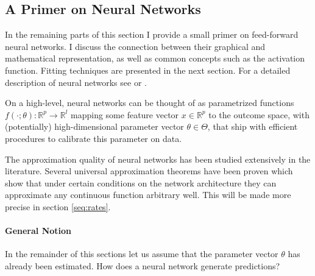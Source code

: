 \subsection{A Primer on Neural Networks}

In the remaining parts of this section I provide a small primer on feed-forward neural
networks. I discuss the connection between their graphical and mathematical
representation, as well as common concepts such as the activation function. Fitting
techniques are presented in the next section. For a detailed description of neural
networks see \cite{Goodfellow.2016, Murphy.2012} or \cite{Hastie.2008}.

On a high-level, neural networks can be thought of as parametrized functions $f(\cdot;
\theta):\mathbb{R}^p \to \mathbb{R}^l$ mapping some feature vector $x \in \mathbb{R}^p$
to the outcome space, with (potentially) high-dimensional parameter vector $\theta \in
\Theta$, that ship with efficient procedures to calibrate this parameter on data.

The approximation quality of neural networks has been studied extensively in the
literature. Several universal approximation theorems have been proven which show that
under certain conditions on the network architecture they can approximate any continuous
function arbitrary well. This will be made more precise in section \ref{seq:rates}.

\paragraph{General Notion}

In the remainder of this sections let us assume that the parameter vector $\theta$
has already been estimated. How does a neural network generate predictions?

